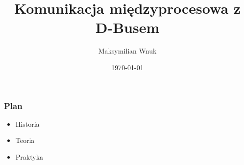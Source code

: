 \documentclass{beamer}
\begin{document}
\title{Komunikacja międzyprocesowa z D-Busem}   
\author{Maksymilian Wnuk} 
\date{\today} 


\begin{frame}
    \titlepage
\end{frame} 

\begin{frame}
\frametitle{Plan}
\begin{itemize}
    \item Historia
    \item Teoria
    \item Praktyka
\end{itemize}
\end{frame}





\end{document}
